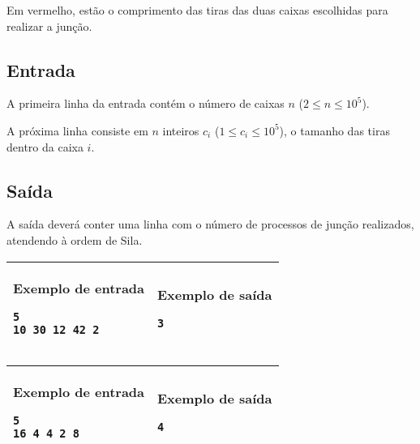 Em vermelho, estão o comprimento das tiras das duas caixas escolhidas para realizar a junção.

\subsection*{Entrada}
 
A primeira linha da entrada contém o número de caixas $n$ ($2\leq n\leq 10^5$).
 
A próxima linha consiste em $n$ inteiros $c_i$ ($1\leq c_i \leq 10^5$), o tamanho das tiras dentro da caixa $i$.
 
\subsection*{Saída}
A saída deverá conter uma linha com o número de processos de junção realizados, atendendo à ordem de Sila.

\newpage
\begin{table}[!h]
\centering
\hspace{-2cm}
\begin{tabular}{|l|l|}
\hline
\begin{minipage}[t]{5.5in}
\textbf{Exemplo de entrada}
\begin{verbatim}
5
10 30 12 42 2
\end{verbatim}
\vspace{1mm}
\end{minipage}
&
\begin{minipage}[t]{1.5in}
\textbf{Exemplo de saída}
\begin{verbatim}
3
\end{verbatim}
\vspace{1mm}
\end{minipage} \\
\hline
\end{tabular}
\end{table}

\begin{table}[!h]
\centering
\hspace{-2cm}
\begin{tabular}{|l|l|}
\hline
\begin{minipage}[t]{5.5in}
\textbf{Exemplo de entrada}
\begin{verbatim}
5
16 4 4 2 8
\end{verbatim}
\vspace{1mm}
\end{minipage}
&
\begin{minipage}[t]{1.5in}
\textbf{Exemplo de saída}
\begin{verbatim}
4
\end{verbatim}
\vspace{1mm}
\end{minipage} \\
\hline
\end{tabular}
\end{table}

